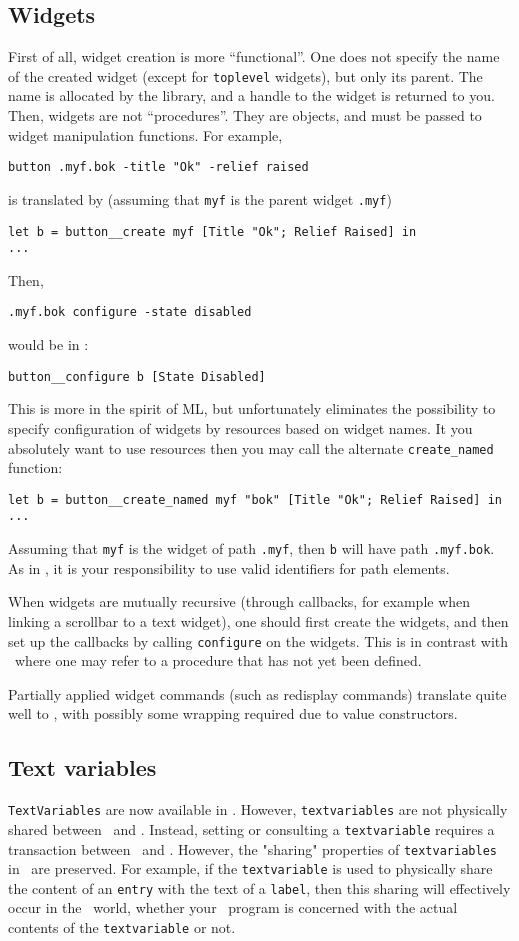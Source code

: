 \subsection{Widgets}
First of all, widget creation is more ``functional''. One does not specify
the name of the created widget (except for \verb|toplevel| widgets), but
only its parent. The name is allocated by the library, and a handle to the
widget is returned to you. Then, widgets are not ``procedures''. They are
objects, and must be passed to widget manipulation functions.
For example,
\begin{verbatim}
button .myf.bok -title "Ok" -relief raised
\end{verbatim} 
is translated by (assuming that \verb|myf| is the parent widget \verb|.myf|)
\begin{verbatim}
let b = button__create myf [Title "Ok"; Relief Raised] in
...
\end{verbatim} 
Then, 
\begin{verbatim}
.myf.bok configure -state disabled
\end{verbatim} 
would be in \caml:
\begin{verbatim}
button__configure b [State Disabled]
\end{verbatim} 

This is more in the spirit of ML, but unfortunately eliminates the
possibility to specify configuration of widgets by resources based on widget 
names. It you absolutely want to use resources then you may call the
alternate \verb|create_named| function:
\begin{verbatim}
let b = button__create_named myf "bok" [Title "Ok"; Relief Raised] in
...
\end{verbatim} 
Assuming that \verb|myf| is the widget of path \verb|.myf|, then \verb|b|
will have path \verb|.myf.bok|. As in \tk, it is your responsibility to use
valid identifiers for path elements.

When widgets are mutually recursive (through callbacks, for example when
linking a scrollbar to a text widget), one should first create the widgets,
and then set up the callbacks by calling \verb|configure| on the widgets.
This is in contrast with \tcl\tk\ where one may refer to a procedure that
has not yet been defined.

Partially applied widget commands (such as redisplay commands) translate
quite well to \caml, with possibly some wrapping required due to 
value constructors.

\subsection{Text variables}
\verb|TextVariables| are now available in \camltk. However,
\verb|textvariables| are not physically shared between \caml\ and \tk.
Instead, setting or consulting a \verb|textvariable| requires a transaction
between \caml\ and \tk. However, the "sharing" properties of 
\verb|textvariables| in \tk\ are preserved. For example, if the
\verb|textvariable| is  
used to physically share the content of an {\tt entry} with the text
of a {\tt label}, then this sharing will effectively occur in the \tk\
world, whether your \caml\ program is concerned with the actual
contents of the \verb|textvariable| or not. 

